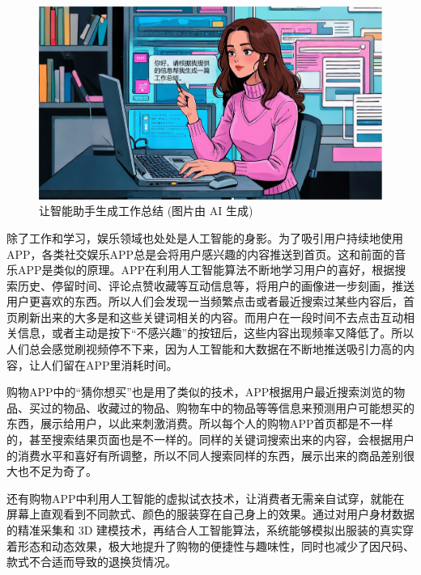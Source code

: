 \begin{figure}[htb]
	\centering
	\includegraphics[width=\linewidth]{image/0/智能助手.png}
	\caption{让智能助手生成工作总结 (图片由 AI 生成)}
\end{figure}

除了工作和学习，娱乐领域也处处是人工智能的身影。为了吸引用户持续地使用APP，各类社交娱乐APP总是会将用户感兴趣的内容推送到首页。这和前面的音乐APP是类似的原理。APP在利用人工智能算法不断地学习用户的喜好，根据搜索历史、停留时间、评论点赞收藏等互动信息等，将用户的画像进一步刻画，推送用户更喜欢的东西。所以人们会发现一当频繁点击或者最近搜索过某些内容后，首页刷新出来的大多是和这些关键词相关的内容。而用户在一段时间不去点击互动相关信息，或者主动是按下“不感兴趣”的按钮后，这些内容出现频率又降低了。所以人们总会感觉刷视频停不下来，因为人工智能和大数据在不断地推送吸引力高的内容，让人们留在APP里消耗时间。

购物APP中的“猜你想买”也是用了类似的技术，APP根据用户最近搜索浏览的物品、买过的物品、收藏过的物品、购物车中的物品等等信息来预测用户可能想买的东西，展示给用户，以此来刺激消费。所以每个人的购物APP首页都是不一样的，甚至搜索结果页面也是不一样的。同样的关键词搜索出来的内容，会根据用户的消费水平和喜好有所调整，所以不同人搜索同样的东西，展示出来的商品差别很大也不足为奇了。

还有购物APP中利用人工智能的虚拟试衣技术，让消费者无需亲自试穿，就能在屏幕上直观看到不同款式、颜色的服装穿在自己身上的效果。通过对用户身材数据的精准采集和 3D 建模技术，再结合人工智能算法，系统能够模拟出服装的真实穿着形态和动态效果，极大地提升了购物的便捷性与趣味性，同时也减少了因尺码、款式不合适而导致的退换货情况。

